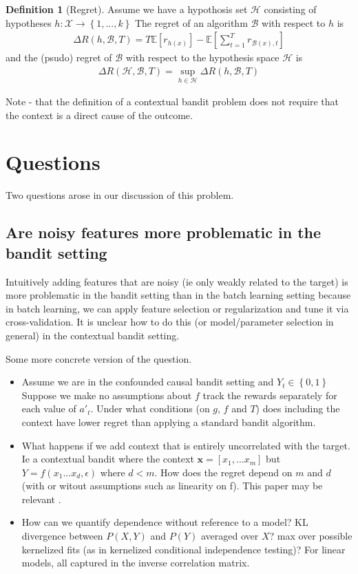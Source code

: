 \documentclass{article}
\newcommand{\E}[1]{\mathbb E\left[#1\right]}
\newcommand{\set}[1]{\left\{#1\right\}}
\newcommand{\eq}[1]{\begin{align*}#1\end{align*}}
\theoremstyle{plain}
\theoremstyle{definition}
\newtheorem{definition}[theorem]{Definition}
\begin{document}
\begin{definition}[Regret] Assume we have a hypothosis set $\mathcal{H}$ consisting of hypotheses $h: \mathcal{X} \rightarrow \set{1,...,k}$
The regret of an algorithm $\mathcal{B}$ with respect to $h$ is
\eq{
\Delta R(h,\mathcal{B},T) = T \E{r_{h(x)}} - \E{\sum_{t=1}^T r_{\mathcal{B}(x),t}}
}
and the (psudo) regret of $\mathcal{B}$ with respect to the hypothesis space $\mathcal{H}$ is 
\eq{
\Delta R(\mathcal{H},\mathcal{B},T) = \sup_{h \in \mathcal{H}}\Delta R(h,\mathcal{B},T)
}
\end{definition}

Note - that the definition of a contextual bandit problem does not require that the context is a direct cause of the outcome.


\section{Questions}
Two questions arose in our discussion of this problem.
\subsection{Are noisy features more problematic in the bandit setting}
Intuitively adding features that are noisy (ie only weakly related to the target) is more problematic in the bandit setting than in the batch learning setting because in batch learning, we can apply feature selection or regularization and tune it via cross-validation. It is unclear how to do this (or model/parameter selection in general) in the contextual bandit setting.

Some more concrete version of the question. 
\begin{itemize}
\item Assume we are in the confounded causal bandit setting and $Y_t \in \set{0,1}$ Suppose we make no assumptions about $f$ track the rewards separately for each value of $a'_t$. Under what conditions (on $g$, $f$ and $T$) does including the context have lower regret than applying a standard bandit algorithm. 

\item What happens if we add context that is entirely uncorrelated with the target. Ie a contextual bandit where the context $\boldsymbol{x} = [x_1,...x_m]$ but $Y = f(x_1...x_d,\epsilon)$ where $d < m$. How does the regret depend on $m$ and $d$ (with or witout assumptions such as linearity on f). This paper may be relevant \cite{abbasi2012online}.

\item How can we quantify dependence without reference to a model? KL divergence between $P(X,Y)$ and $P(Y)$ averaged over $X$? max over possible kernelized fits (as in kernelized conditional independence testing)? For linear models, all captured in the inverse correlation matrix.  

\end{itemize}
\end{document}
